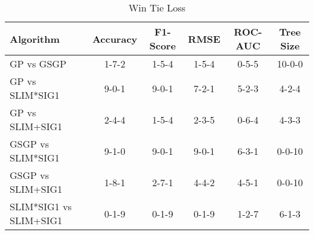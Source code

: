 
    \begin{table}[H]
        \centering
        \renewcommand{\arraystretch}{1.2}
        \caption{Win Tie Loss}
        \label{tab:RQ_Comparison_wtl}
    \begin{tabular}{lccccc}
\toprule
Algorithm & Accuracy & F1-Score & RMSE & ROC-AUC & Tree Size \\
\midrule
GP vs GSGP & 1-7-2 & 1-5-4 & 1-5-4 & 0-5-5 & 10-0-0 \\
GP vs SLIM*SIG1 & 9-0-1 & 9-0-1 & 7-2-1 & 5-2-3 & 4-2-4 \\
GP vs SLIM+SIG1 & 2-4-4 & 1-5-4 & 2-3-5 & 0-6-4 & 4-3-3 \\
GSGP vs SLIM*SIG1 & 9-1-0 & 9-0-1 & 9-0-1 & 6-3-1 & 0-0-10 \\
GSGP vs SLIM+SIG1 & 1-8-1 & 2-7-1 & 4-4-2 & 4-5-1 & 0-0-10 \\
SLIM*SIG1 vs SLIM+SIG1 & 0-1-9 & 0-1-9 & 0-1-9 & 1-2-7 & 6-1-3 \\
\bottomrule
\end{tabular}

        
    \end{table}
    